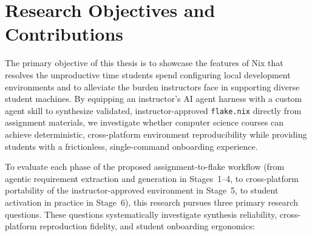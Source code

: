 \section{Research Objectives and Contributions}

The primary objective of this thesis is to showcase the features of Nix that resolves
the unproductive time students spend configuring local development environments and
to alleviate the burden instructors face in supporting diverse student machines.
By equipping an instructor's AI agent harness with a custom agent skill to
synthesize validated, instructor-approved \texttt{flake.nix} directly from
assignment materials, we investigate whether computer science courses can achieve
deterministic, cross-platform environment reproducibility while providing
students with a frictionless, single-command onboarding experience.

To evaluate each phase of the proposed assignment-to-flake workflow (from
agentic requirement extraction and generation in Stages~1--4, to cross-platform
portability of the instructor-approved environment in Stage~5, to student activation
in practice in Stage~6), this research pursues three primary research questions.
These questions systematically investigate synthesis reliability, cross-platform reproduction
fidelity, and student onboarding ergonomics: \rqlist

